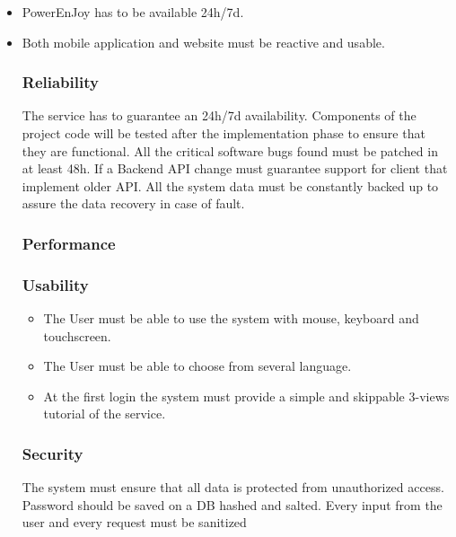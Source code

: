 \documentclass[english]{article}
\begin{document}
\begin{itemize}
	\item PowerEnJoy has to be available 24h/7d.
	\item Both mobile application and website must be reactive and usable.
	
\subsubsection{Reliability}%

The service has to guarantee an 24h/7d availability. Components of the project code will be tested after the implementation phase to ensure that they are functional. 
All the critical software bugs found must be patched in at least 48h.
If a Backend API change must guarantee support for client that implement older API.
All the system data must be constantly backed up to assure the data recovery in case of fault.


\subsubsection{Performance}

\subsubsection{Usability}
\begin{itemize}
	\item The User must be able to use the system with mouse, keyboard and touchscreen.
	\item The User must be able to choose from several language.
	\item At the first login the system must provide a simple and skippable 3-views tutorial of the service.
\end{itemize}



\subsubsection{Security}

The system must ensure that all data is protected from unauthorized
access. Password should be saved on a DB hashed and salted.
Every input from the user and every request must be sanitized 

\end{itemize}
\end{document}
